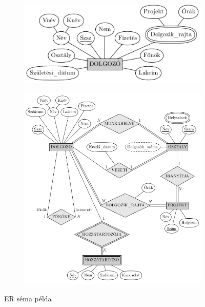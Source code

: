 \begin{figure}[h]
	\begin{subfigure}{0.4\textwidth}
		\centering
		\includegraphics[width=\linewidth]{fig/6-ER_example1}
		\caption{}
		\label{fig:6-erexample1}
	\end{subfigure}
	\begin{subfigure}{0.6\textwidth}
		\centering
		\includegraphics[width=\linewidth]{fig/6-ER_example2}
		\caption{}
		\label{fig:6-erexample2}
	\end{subfigure}
	\caption{ER séma példa}
	\end{figure}

